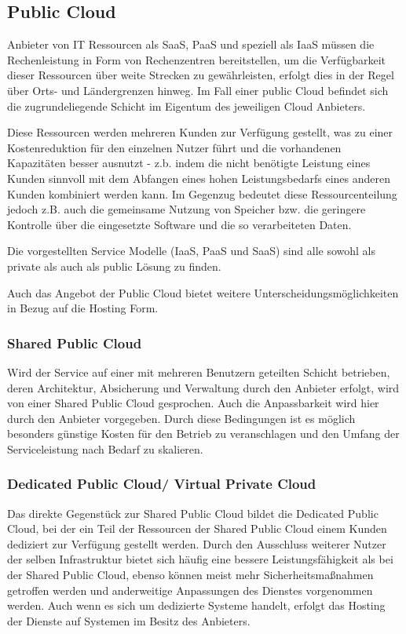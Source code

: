 \subsection{Public Cloud}
Anbieter von IT Ressourcen als SaaS, PaaS und speziell als IaaS müssen die Rechenleistung in Form von Rechenzentren bereitstellen, um die Verfügbarkeit dieser Ressourcen über weite Strecken zu gewährleisten, erfolgt dies in der Regel über Orts- und Ländergrenzen hinweg. Im Fall einer public Cloud befindet sich die zugrundeliegende Schicht im Eigentum des jeweiligen Cloud Anbieters.

Diese Ressourcen werden mehreren Kunden zur Verfügung gestellt, was zu einer Kostenreduktion für den einzelnen Nutzer führt und die vorhandenen Kapazitäten besser ausnutzt - z.b. indem die nicht benötigte Leistung eines Kunden sinnvoll mit dem Abfangen eines hohen Leistungsbedarfs eines anderen Kunden kombiniert werden kann.
Im Gegenzug bedeutet diese Ressourcenteilung jedoch z.B. auch die gemeinsame Nutzung von Speicher bzw. die geringere Kontrolle über die eingesetzte Software und die so verarbeiteten Daten.

Die vorgestellten Service Modelle (IaaS, PaaS und SaaS) sind alle sowohl als private als auch als public Lösung zu finden.

Auch das Angebot der Public Cloud bietet weitere Unterscheidungsmöglichkeiten in Bezug auf die Hosting Form.

\subsubsection{Shared Public Cloud}
Wird der Service auf einer mit mehreren Benutzern geteilten Schicht betrieben, deren Architektur, Absicherung und Verwaltung durch den Anbieter erfolgt, wird von einer Shared Public Cloud gesprochen. Auch die Anpassbarkeit wird hier durch den Anbieter vorgegeben. Durch diese Bedingungen ist es möglich besonders günstige Kosten für den Betrieb zu veranschlagen und den Umfang der Serviceleistung nach Bedarf zu skalieren. 

\subsubsection{Dedicated Public Cloud/ Virtual Private Cloud}
Das direkte Gegenstück zur Shared Public Cloud bildet die Dedicated Public Cloud, bei der ein Teil der Ressourcen der Shared Public Cloud einem Kunden dediziert zur Verfügung gestellt werden. Durch den Ausschluss weiterer Nutzer der selben Infrastruktur bietet sich häufig eine bessere Leistungsfähigkeit als bei der Shared Public Cloud, ebenso können meist mehr Sicherheitsmaßnahmen getroffen werden und anderweitige Anpassungen des Dienstes vorgenommen werden. Auch wenn es sich um dedizierte Systeme handelt, erfolgt das Hosting der Dienste auf Systemen im Besitz des Anbieters.


